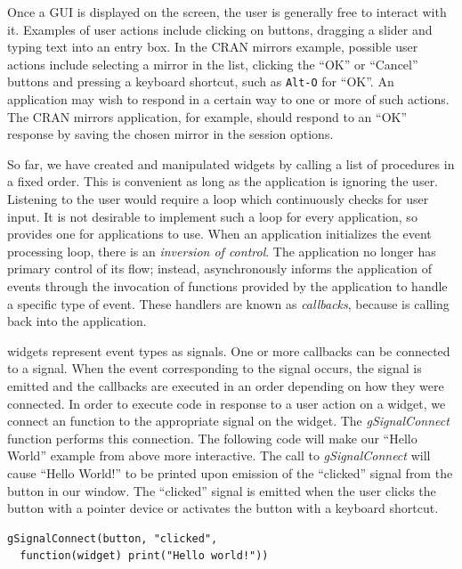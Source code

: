 \documentclass[article]{jss}
\begin{document}
Once a GUI is displayed on the screen, the user is 
generally free to interact with it. Examples of user actions include 
clicking on buttons, dragging a slider and typing text into an entry box.
In the CRAN mirrors example, possible user actions include
selecting a mirror in the list, clicking the ``OK'' or ``Cancel'' buttons 
and pressing a keyboard shortcut, such as \texttt{Alt-O} for ``OK''. 
An application may wish to respond in a certain way to one or more of such actions.
The CRAN mirrors application, for example, should respond to an ``OK'' response
by saving the chosen mirror in the session options.

So far, we have created and manipulated widgets by calling a list
of procedures in a fixed order. This is convenient as long as the application
is ignoring the user. Listening to the user would
require a loop which continuously checks for user input.
It is not desirable to implement such a loop for every application, so
 provides one for applications to use. When an application
initializes the  event processing loop, there is an 
\emph{inversion of control}. The application no longer has primary control
of its flow; instead,  asynchronously informs the application of 
events through the invocation of functions provided by the application to 
handle a specific type of event. These handlers are known as 
\emph{callbacks}, because  is calling back into the application. 

 widgets represent event types as signals. One or more
callbacks can be connected to a signal. When the event corresponding to the
signal occurs, the signal is emitted and the callbacks are executed in an order
depending on how they were connected. In order to execute  code in 
response to a user action on a widget, we connect an  function to the 
appropriate signal on the widget.  The \emph{gSignalConnect} function 
performs this connection. The following code will make our ``Hello World'' 
example from above more interactive.
The call to \emph{gSignalConnect} will cause ``Hello World!'' to be printed 
upon emission of the ``clicked'' signal from the button in our window. The 
``clicked'' signal is emitted when the user clicks the button with a pointer
device or activates the button with a keyboard shortcut.
\begin{verbatim}
gSignalConnect(button, "clicked", 
  function(widget) print("Hello world!"))
\end{verbatim}
\end{document}
